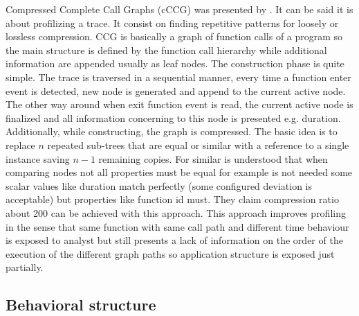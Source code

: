 Compressed Complete Call Graphs (cCCG) was
presented by \cite{knupfer2005construction}. It can be said it is about 
profilizing a trace. It consist on finding repetitive 
patterns for loosely or lossless compression.  
CCG is basically a graph of function calls of a program so the main structure is
defined by the function call hierarchy while additional information are appended
usually as leaf nodes. The construction phase is quite simple. The trace is
traversed in a sequential manner, every time a function enter event is detected,
new node is generated and append to the current active node. The
other way around when exit function event is read, the current active node is
finalized and all information concerning to this node is presented e.g.
duration. Additionally, while constructing, the graph is compressed. The basic 
idea is to replace $n$ repeated sub-trees that are equal or similar with a 
reference to a single instance saving $n-1$ remaining copies. For similar is
understood that when comparing nodes not all properties must be equal for
example is not needed some scalar values like duration match perfectly (some
configured deviation is acceptable) but properties like function id must. They
claim compression ratio about 200 can be achieved with this approach.
This approach improves profiling in the sense that same function with same call
path and different time behaviour is exposed to analyst but still presents a lack 
of information on the order of the execution of the different graph paths so
application structure is exposed just partially. 


\subsection{Behavioral structure}\label{ss:behavioral_structure}

